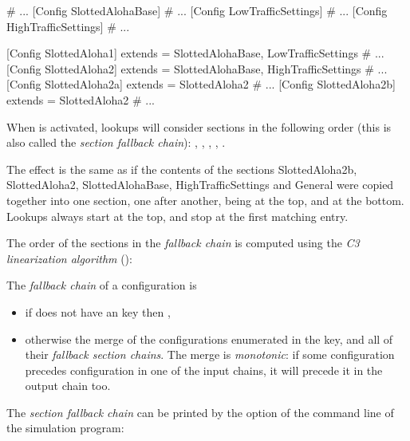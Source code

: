 \begin{inifile}
[General]
# ...
[Config SlottedAlohaBase]
# ...
[Config LowTrafficSettings]
# ...
[Config HighTrafficSettings]
# ...

[Config SlottedAloha1]
extends = SlottedAlohaBase, LowTrafficSettings
# ...
[Config SlottedAloha2]
extends = SlottedAlohaBase, HighTrafficSettings
# ...
[Config SlottedAloha2a]
extends = SlottedAloha2
# ...
[Config SlottedAloha2b]
extends = SlottedAloha2
# ...
\end{inifile}

When  is activated, lookups will consider sections in the
following order (this is also called the \textit{section fallback chain}):
, , ,
, .

The effect is the same as if the contents of the sections
SlottedAloha2b, SlottedAloha2, SlottedAlohaBase, HighTrafficSettings and
General were copied together into one section, one after another,
 being at the top, and \ttt{[General]}
at the bottom. Lookups always start at the top, and stop at the first
matching entry.

The order of the sections in the \textit{fallback chain} is computed
using the \textit{C3 linearization algorithm} (\cite{Barrett1996}):

The \textit{fallback chain} of a configuration  is
\begin{itemize}
  \item if  does not have an  key then
        , 
  \item otherwise the merge of the configurations enumerated in the
         key, and all of their \textit{fallback section chains}.
        The merge is \textit{monotonic}: if some configuration 
        precedes configuration  in one of the input chains,
        it will precede it in the output chain too.
\end{itemize}

The \textit{section fallback chain} can be printed by the  option
of the command line of the simulation program:


